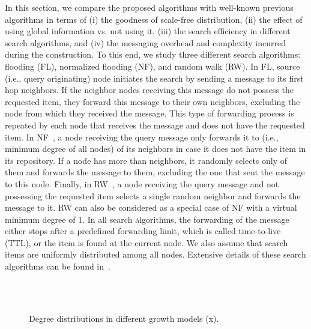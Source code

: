 \documentclass[10pt,journal,cspaper,compsoc]{IEEEtran}
\begin{document}
In this section, we compare the proposed algorithms with well-known previous algorithms in terms of (i) the goodness of scale-free distribution, (ii) the effect of using global information vs. not using it, (iii) the search efficiency in different search algorithms, and  (iv) the messaging overhead and complexity incurred during the construction.  To this end, we study three different search algorithms: flooding (FL), normalized flooding (NF), and random walk (RW). In FL, source (i.e., query originating) node initiates the search by sending a message to its first hop neighbors. If the neighbor nodes receiving this message do not possess the requested item, they forward this message to their own neighbors, excluding the node from which they received the message. This type of forwarding process is repeated by each node that receives the message and does not have the requested item. In NF~\cite{nf}, a node receiving the query message only forwards it to  (i.e., minimum degree of all nodes) of its neighbors in case it does not have the item in its repository. If a node has more than  neighbors, it randomly selects only  of them and forwards the message to them, excluding the one that sent the message to this node. Finally, in RW~\cite{rw}, a node receiving the query message and not possessing the requested item selects a single random neighbor and forwards the message to it. RW can also be considered as a special case of NF with a virtual minimum degree of 1. In all search algorithms, the forwarding of the message either stops after a predefined forwarding limit, which is called time-to-live (TTL), or the item is found at the current node. We also assume that search items are uniformly distributed among all nodes. Extensive details of these search algorithms can be found in~\cite{guclu}.


\begin{figure*}
\begin{center}
\\
\\
\caption{Degree distributions in different growth models (x).}
\label{fig:dist}
\end{center}
\end{figure*}
\end{document}
